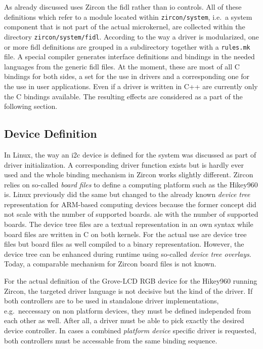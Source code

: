 As already discussed uses Zircon the \acf{fidl} rather than \ac{io} controls.
All of these definitions which refer to a module located within \texttt{zircon/system}, i.e.\ a system component that is not part of the actual microkernel, are collected within the directory \texttt{zircon/system/fidl}.
According to the way a driver is modularized, one or more \ac{fidl} definitions are grouped in a subdirectory together with a \texttt{rules.mk} file.
A special compiler generates interface definitions and bindings in the needed languages from the generic \ac{fidl} files.
At the moment, these are most of all C bindings for both sides, a set for the use in drivers and a corresponding one for the use in user applications.
Even if a driver is written in C++ are currently only the C bindings available.
The resulting effects are considered as a part of the following section.

\subsection{Device Definition}
In Linux, the way an \ac{i2c} device is defined for the system was discussed as part of driver initialization.
A corresponding driver function exists but is hardly ever used and the whole binding mechanism in Zircon works slightly different.
Zircon relies on so-called \textit{board files} to define a computing platform such as the Hikey960 is.
Linux previously did the same but changed to the already known \textit{device tree} representation for ARM-based computing devices because the former concept did not scale with the number of supported boards.
ale with the number of supported boards.
The device tree files are a textual representation in an own syntax while board files are written in C on both kernels.
For the actual use are device tree files but board files as well compiled to a binary representation.
However, the device tree can be enhanced during runtime using so-called \textit{device tree overlays}.
Today, a comparable mechanism for Zircon board files is not known.

For the actual definition of the Grove-LCD RGB device for the Hikey960 running Zircon, the targeted driver language is not decisive but the kind of the driver.
If both controllers are to be used in standalone driver implementations, e.g.\ neccessary on non platform devices, they must be defined independed from each other as well.
After all, a driver must be able to pick exactly the desired device controller.
In cases a combined \textit{platform device} specific driver is requested, both controllers must be accessable from the same binding sequence.

